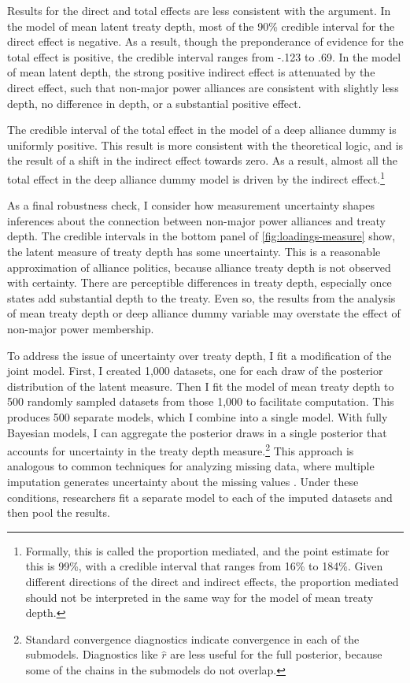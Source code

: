 \documentclass[12pt]{article}
\begin{document}
Results for the direct and total effects are less consistent with the argument. 
In the model of mean latent treaty depth, most of the 90\% credible interval for the direct effect is negative. 
As a result, though the preponderance of evidence for the total effect is positive, the credible interval ranges from -.123 to .69.
In the model of mean latent depth, the strong positive indirect effect is attenuated by the direct effect, such that non-major power alliances are consistent with slightly less depth, no difference in depth, or a substantial positive effect. 


The credible interval of the total effect in the model of a deep alliance dummy is uniformly positive. 
This result is more consistent with the theoretical logic, and is the result of a shift in the indirect effect towards zero. 
As a result, almost all the total effect in the deep alliance dummy model is driven by the indirect effect.\footnote{Formally, this is called the proportion mediated, and the point estimate for this is 99\%, with a credible interval that ranges from 16\% to 184\%. Given different directions of the direct and indirect effects, the proportion mediated should not be interpreted in the same way for the model of mean treaty depth.}


As a final robustness check, I consider how measurement uncertainty shapes inferences about the connection between non-major power alliances and treaty depth. 
The credible intervals in the bottom panel of \autoref{fig:loadings-measure} show, the latent measure of treaty depth has some uncertainty. 
This is a reasonable approximation of alliance politics, because alliance treaty depth is not observed with certainty. 
There are perceptible differences in treaty depth, especially once states add substantial depth to the treaty. 
Even so, the results from the analysis of mean treaty depth or deep alliance dummy variable may overstate the effect of non-major power membership. 


To address the issue of uncertainty over treaty depth, I fit a modification of the joint model. 
First, I created 1,000 datasets, one for each draw of the posterior distribution of the latent measure.
Then I fit the model of mean treaty depth to 500 randomly sampled datasets from those 1,000 to facilitate computation. 
This produces 500 separate models, which I combine into a single model. 
With fully Bayesian models, I can aggregate the posterior draws in a single posterior that accounts for uncertainty in the treaty depth measure.\footnote{Standard convergence diagnostics indicate convergence in each of the submodels. Diagnostics like $\hat{r}$ are less useful for the full posterior, because some of the chains in the submodels do not overlap.}
This approach is analogous to common techniques for analyzing missing data, where multiple imputation generates uncertainty about the missing values \citep{Hollenbachetal2018imp}.
Under these conditions, researchers fit a separate model to each of the imputed datasets and then pool the results. 
\end{document}
